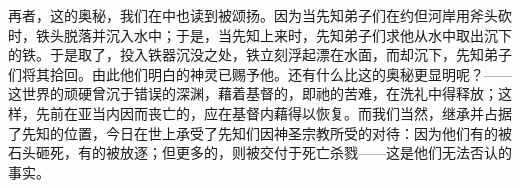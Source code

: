 再者，这的奥秘，我们在中也读到被颂扬。因为当先知弟子们在约但河岸用斧头砍时，铁头脱落并沉入水中；于是，当先知上来时，先知弟子们求他从水中取出沉下的铁。于是取了，投入铁器沉没之处，铁立刻浮起漂在水面，而却沉下，先知弟子们将其拾回。由此他们明白的神灵已赐予他。还有什么比这的奥秘更显明呢？——这世界的顽硬曾沉于错误的深渊，藉着基督的，即祂的苦难，在洗礼中得释放；这样，先前在亚当内因而丧亡的，应在基督内藉得以恢复。而我们当然，继承并占据了先知的位置，今日在世上承受了先知们因神圣宗教所受的对待：因为他们有的被石头砸死，有的被放逐；但更多的，则被交付于死亡杀戮——这是他们无法否认的事实。\par

